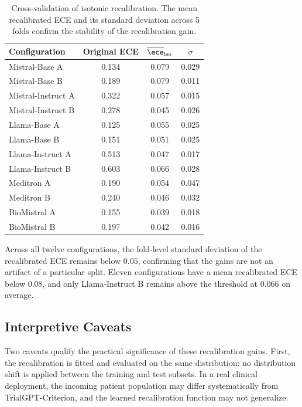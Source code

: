 \begin{table}[htbp]
    \centering
    \caption{Cross-validation of isotonic recalibration. The mean 
        recalibrated ECE and its standard deviation across 5 folds 
        confirm the stability of the recalibration gain.}
    \label{tab:res-recalibration-cv}
    \small
    \begin{tabular}{@{}lccc@{}}
        \toprule
        \textbf{Configuration} & 
        \textbf{Original ECE} & 
        \boldmath$\overline{\ece}_\text{iso}$ & 
        \boldmath$\sigma$ \\
        \midrule
        Mistral-Base A     & 0.134 & 0.079 & 0.029 \\
        Mistral-Base B     & 0.189 & 0.079 & 0.011 \\
        Mistral-Instruct A & 0.322 & 0.057 & 0.015 \\
        Mistral-Instruct B & 0.278 & 0.045 & 0.026 \\
        Llama-Base A       & 0.125 & 0.055 & 0.025 \\
        Llama-Base B       & 0.151 & 0.051 & 0.025 \\
        Llama-Instruct A   & 0.513 & 0.047 & 0.017 \\
        Llama-Instruct B   & 0.603 & 0.066 & 0.028 \\
        Meditron A         & 0.190 & 0.054 & 0.047 \\
        Meditron B         & 0.240 & 0.046 & 0.032 \\
        BioMistral A       & 0.155 & 0.039 & 0.018 \\
        BioMistral B       & 0.197 & 0.042 & 0.016 \\
        \bottomrule
    \end{tabular}
\end{table}

Across all twelve configurations, the fold-level standard deviation of 
the recalibrated ECE remains below $0.05$, confirming that the gains are 
not an artifact of a particular split. Eleven configurations have a 
mean recalibrated ECE below $0.08$, and only Llama-Instruct B remains 
above the threshold at $0.066$ on average.

\subsection{Interpretive Caveats}
\label{subsec:res-recalibration-caveats}

Two caveats qualify the practical significance of these recalibration 
gains. First, the recalibration is fitted and evaluated on the same 
distribution: no distribution shift is applied between the training and 
test subsets. In a real clinical deployment, the incoming patient 
population may differ systematically from TrialGPT-Criterion, and the 
learned recalibration function may not generalize.

